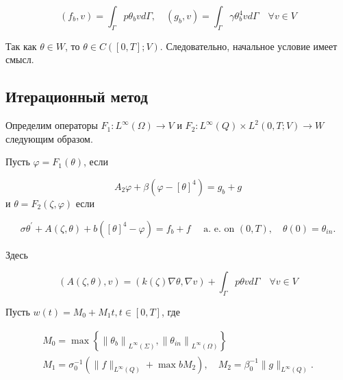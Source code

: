 \[
    \left(f_{b}, v\right)=\int_{\Gamma} p \theta_{b} v d \Gamma,
    \quad\left(g_{b}, v\right)=\int_{\Gamma} \gamma \theta_{b}^{4} v d \Gamma \quad \forall v \in V
\]

\begin{remark}
Так как $\theta \in W$, то $\theta \in C([0, T] ; V)$.
Следовательно, начальное условие имеет смысл.
\end{remark}

\subsection{Итерационный метод}
\label{subsec:ch3/sec1/iterative}
Определим операторы
$F_{1}: L^{\infty}(\Omega) \rightarrow V$ и $F_{2}: L^{\infty}(Q) \times L^{2}(0, T ;V) \rightarrow W$
следующим образом.


Пусть $\varphi=F_{1}(\theta)$, если

\begin{equation}
    \label{eq:3_1:6}
    A_{2} \varphi+\beta\left(\varphi-[\theta]^{4}\right)=g_{b}+g
\end{equation}
и $\theta=F_{2}(\zeta, \varphi)$ если

\begin{equation}
    \label{eq:3_1:7}
    \sigma \theta^{\prime}+A(\zeta, \theta)+b\left([\theta]^{4}-\varphi\right)=f_{b}
    +f \quad \text { a. e. on }(0, T), \quad \theta(0)=\theta_{i n}.
\end{equation}


Здесь

\[
    (A(\zeta, \theta), v)=(k(\zeta) \nabla \theta, \nabla v)
    +\int_{\Gamma} p \theta v d \Gamma \quad \forall v \in V
\]


Пусть $w(t)=M_{0}+M_{1} t, t \in[0, T]$, где

\[
    \begin{gathered}
        M_{0}=\max \left\{\left\|\theta_{b}\right\|_{L^{\infty}(\Sigma)},
        \left\|\theta_{i n}\right\|_{L^{\infty}(\Omega)}\right\} \\
        M_{1}=\sigma_{0}^{-1}\left(\|f\|_{L^{\infty}(Q)}+\max b M_{2}\right),
        \quad M_{2}=\beta_{0}^{-1}\|g\|_{L^{\infty}(Q)}.
    \end{gathered}
\]



